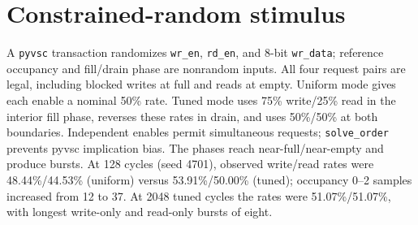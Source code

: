 \section{Constrained-random stimulus}
\label{sec:crv}



A \texttt{pyvsc} transaction randomizes \texttt{wr\_en}, \texttt{rd\_en},
and 8-bit \texttt{wr\_data}; reference occupancy and fill/drain phase are
nonrandom inputs. All four request pairs are legal, including blocked writes
at full and reads at empty. Uniform mode gives each enable a nominal 50\%
rate. Tuned mode uses 75\% write/25\% read in the interior fill phase,
reverses these rates in drain, and uses 50\%/50\% at both boundaries.
Independent enables permit simultaneous requests; \texttt{solve\_order}
prevents pyvsc implication bias. The phases reach near-full/near-empty and
produce bursts. At 128 cycles (seed 4701), observed write/read rates were
48.44\%/44.53\% (uniform) versus 53.91\%/50.00\% (tuned); occupancy 0--2
samples increased from 12 to 37. At 2048 tuned cycles the rates were
51.07\%/51.07\%, with longest write-only and read-only bursts of eight.